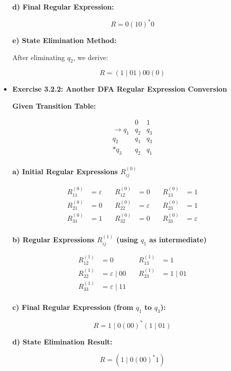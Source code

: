 \documentclass[11pt]{article}
\begin{document}
\begin{itemize}[leftmargin=*]
\textbf{d) Final Regular Expression:}

\[
R = 0(10)^*0
\]

\textbf{e) State Elimination Method:}

After eliminating \( q_2 \), we derive:

\[
R = (1 \mid 01)00(0)
\]

\vspace{1em}

\item \textbf{Exercise 3.2.2: Another DFA Regular Expression Conversion}

\textbf{Given Transition Table:}

\[
\begin{array}{c|cc}
    & 0 & 1 \\
    \hline
    \rightarrow q_1 & q_2 & q_3 \\
    q_2 & q_1 & q_3 \\
    *q_3 & q_2 & q_1 \\
\end{array}
\]

\textbf{a) Initial Regular Expressions \( R^{(0)}_{ij} \)}

\[
\begin{aligned}
R^{(0)}_{11} &= \varepsilon &\quad R^{(0)}_{12} &= 0 &\quad R^{(0)}_{13} &= 1 \\
R^{(0)}_{21} &= 0 &\quad R^{(0)}_{22} &= \varepsilon &\quad R^{(0)}_{23} &= 1 \\
R^{(0)}_{31} &= 1 &\quad R^{(0)}_{32} &= 0 &\quad R^{(0)}_{33} &= \varepsilon \\
\end{aligned}
\]

\textbf{b) Regular Expressions \( R^{(1)}_{ij} \) (using \( q_1 \) as intermediate)}

\[
\begin{aligned}
R^{(1)}_{12} &= 0 &\quad R^{(1)}_{13} &= 1 \\
R^{(1)}_{22} &= \varepsilon \mid 00 &\quad R^{(1)}_{23} &= 1 \mid 01 \\
R^{(1)}_{33} &= \varepsilon \mid 11 \\
\end{aligned}
\]

\textbf{c) Final Regular Expression (from \( q_1 \) to \( q_3 \)):}

\[
R = 1 \mid 0(00)^*(1 \mid 01)
\]

\textbf{d) State Elimination Result:}

\[
R = (1 \mid 0(00)^*1)
\]


\end{itemize}
\end{document}
